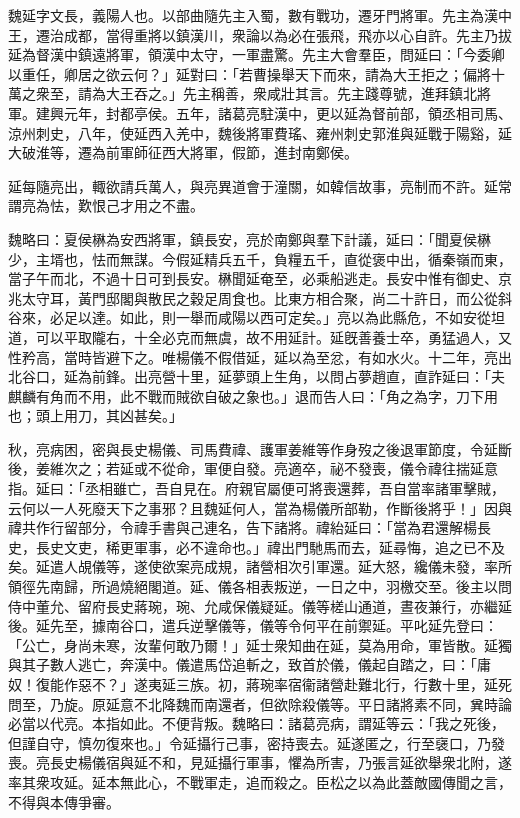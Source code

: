 
\begin{pinyinscope}
魏延字文長，義陽人也。以部曲隨先主入蜀，數有戰功，遷牙門將軍。先主為漢中王，遷治成都，當得重將以鎮漢川，衆論以為必在張飛，飛亦以心自許。先主乃拔延為督漢中鎮遠將軍，領漢中太守，一軍盡驚。先主大會羣臣，問延曰：「今委卿以重任，卿居之欲云何？」延對曰：「若曹操舉天下而來，請為大王拒之；偏將十萬之衆至，請為大王吞之。」先主稱善，衆咸壯其言。先主踐尊號，進拜鎮北將軍。建興元年，封都亭侯。五年，諸葛亮駐漢中，更以延為督前部，領丞相司馬、涼州刺史，八年，使延西入羌中，魏後將軍費瑤、雍州刺史郭淮與延戰于陽谿，延大破淮等，遷為前軍師征西大將軍，假節，進封南鄭侯。

延每隨亮出，輙欲請兵萬人，與亮異道會于潼關，如韓信故事，亮制而不許。延常謂亮為怯，歎恨己才用之不盡。

魏略曰：夏侯楙為安西將軍，鎮長安，亮於南鄭與羣下計議，延曰：「聞夏侯楙少，主壻也，怯而無謀。今假延精兵五千，負糧五千，直從褒中出，循秦嶺而東，當子午而北，不過十日可到長安。楙聞延奄至，必乘船逃走。長安中惟有御史、京兆太守耳，黃門邸閣與散民之穀足周食也。比東方相合聚，尚二十許日，而公從斜谷來，必足以達。如此，則一舉而咸陽以西可定矣。」亮以為此縣危，不如安從坦道，可以平取隴右，十全必克而無虞，故不用延計。延旣善養士卒，勇猛過人，又性矜高，當時皆避下之。唯楊儀不假借延，延以為至忿，有如水火。十二年，亮出北谷口，延為前鋒。出亮營十里，延夢頭上生角，以問占夢趙直，直詐延曰：「夫麒麟有角而不用，此不戰而賊欲自破之象也。」退而告人曰：「角之為字，刀下用也；頭上用刀，其凶甚矣。」

秋，亮病困，密與長史楊儀、司馬費禕、護軍姜維等作身歿之後退軍節度，令延斷後，姜維次之；若延或不從命，軍便自發。亮適卒，祕不發喪，儀令禕往揣延意指。延曰：「丞相雖亡，吾自見在。府親官屬便可將喪還葬，吾自當率諸軍擊賊，云何以一人死廢天下之事邪？且魏延何人，當為楊儀所部勒，作斷後將乎！」因與禕共作行留部分，令禕手書與己連名，告下諸將。禕紿延曰：「當為君還解楊長史，長史文吏，稀更軍事，必不違命也。」禕出門馳馬而去，延尋悔，追之已不及矣。延遣人覘儀等，遂使欲案亮成規，諸營相次引軍還。延大怒，纔儀未發，率所領徑先南歸，所過燒絕閣道。延、儀各相表叛逆，一日之中，羽檄交至。後主以問侍中董允、留府長史蔣琬，琬、允咸保儀疑延。儀等槎山通道，晝夜兼行，亦繼延後。延先至，據南谷口，遣兵逆擊儀等，儀等令何平在前禦延。平叱延先登曰：「公亡，身尚未寒，汝輩何敢乃爾！」延士衆知曲在延，莫為用命，軍皆散。延獨與其子數人逃亡，奔漢中。儀遣馬岱追斬之，致首於儀，儀起自踏之，曰：「庸奴！復能作惡不？」遂夷延三族。初，蔣琬率宿衞諸營赴難北行，行數十里，延死問至，乃旋。原延意不北降魏而南還者，但欲除殺儀等。平日諸將素不同，兾時論必當以代亮。本指如此。不便背叛。魏略曰：諸葛亮病，謂延等云：「我之死後，但謹自守，慎勿復來也。」令延攝行己事，密持喪去。延遂匿之，行至襃口，乃發喪。亮長史楊儀宿與延不和，見延攝行軍事，懼為所害，乃張言延欲舉衆北附，遂率其衆攻延。延本無此心，不戰軍走，追而殺之。臣松之以為此蓋敵國傳聞之言，不得與本傳爭審。


\end{pinyinscope}